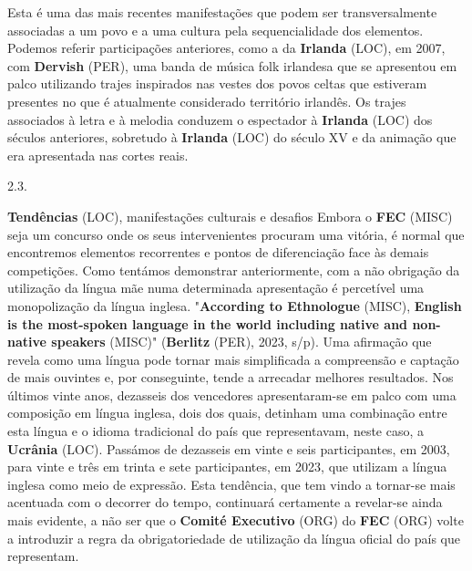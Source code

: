 \documentclass[12pt,a4paper]{article}
\begin{document}
Esta  é  uma  das  mais  recentes  manifestações  que  podem  ser  transversalmente associadas  a  um  povo  e  a  uma  cultura  pela  sequencialidade  dos  elementos.  Podemos referir participações anteriores, como a da \textbf{Irlanda} (LOC), em 2007, com \textbf{Dervish} (PER), uma banda de música folk irlandesa que se apresentou em palco utilizando trajes inspirados nas vestes dos  povos  celtas  que  estiveram  presentes  no  que  é  atualmente  considerado  território irlandês. Os trajes associados à letra e à melodia  conduzem o espectador à \textbf{Irlanda} (LOC) dos séculos anteriores, sobretudo à \textbf{Irlanda} (LOC) do século XV e da animação que era apresentada nas cortes reais.

2.3.

\textbf{Tendências} (LOC), manifestações culturais e desafios Embora  o  \textbf{FEC} (MISC)  seja  um  concurso  onde  os  seus  intervenientes  procuram  uma vitória, é normal que encontremos elementos recorrentes e pontos de diferenciação face às demais competições. Como tentámos demonstrar anteriormente, com a não obrigação da  utilização  da  língua  mãe  numa  determinada  apresentação  é  percetível  uma monopolização da língua inglesa. "\textbf{According to Ethnologue} (MISC), \textbf{English is the most-spoken language in the world including native and non-native speakers} (MISC)" (\textbf{Berlitz} (PER), 2023, s/p). Uma afirmação que revela como uma língua pode tornar mais simplificada a compreensão e captação de mais ouvintes e, por conseguinte, tende a arrecadar melhores resultados. Nos últimos  vinte  anos,  dezasseis  dos  vencedores  apresentaram-se  em  palco  com  uma composição  em  língua  inglesa,  dois  dos  quais,  detinham  uma  combinação  entre  esta língua e o idioma tradicional do país que representavam, neste caso, a \textbf{Ucrânia} (LOC). Passámos de  dezasseis  em  vinte  e  seis  participantes,  em  2003,  para  vinte  e  três  em  trinta  e  sete participantes,  em  2023,  que  utilizam  a  língua  inglesa  como  meio  de  expressão.  Esta tendência, que tem vindo a tornar-se mais acentuada com o decorrer do tempo, continuará certamente a revelar-se ainda mais evidente, a não ser que o \textbf{Comité Executivo} (ORG) do \textbf{FEC} (ORG) volte a introduzir a regra da obrigatoriedade de utilização da língua oficial do país que representam.
\end{document}
